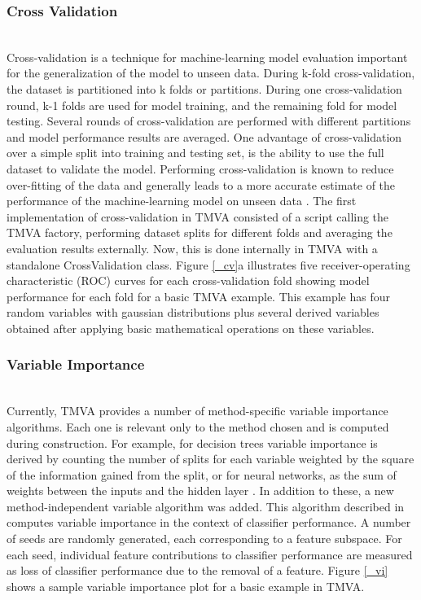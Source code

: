 \documentclass[a4paper]{jpconf}
\begin{document}
\subsubsection{Cross Validation}\hspace*{\fill} \\ 
Cross-validation is a technique for machine-learning model evaluation important for the generalization of the model to unseen data. During k-fold cross-validation, the dataset is partitioned into k folds or partitions. During one cross-validation round, k-1 folds are used for model training, and the remaining fold for model testing. Several rounds of cross-validation are performed with different partitions and model performance results are averaged. One advantage of cross-validation over a simple split into training and testing set, is the ability to use the full dataset to validate the model. Performing cross-validation is known to reduce over-fitting of the data and generally leads to a more accurate estimate of the performance of the machine-learning model on unseen data \cite{arlot2010survey}.\newline\newline 
The first implementation of cross-validation in TMVA consisted of a script calling the TMVA factory, performing dataset splits for different folds and averaging the evaluation results externally. Now, this is done internally in TMVA with a standalone CrossValidation class. Figure \ref{_cv}a illustrates five receiver-operating characteristic (ROC) curves for each cross-validation fold showing model performance for each fold for a basic TMVA example. This example has four random variables with gaussian distributions plus several derived variables obtained after applying basic mathematical operations on these variables.

\subsubsection{Variable Importance}\hspace*{\fill} \\
Currently, TMVA provides a number of method-specific variable importance algorithms. Each one is relevant only to the method chosen and is computed during construction. For example, for decision trees variable importance is derived by counting the number of splits for each variable weighted by the square of the information gained from the split,   or for neural networks, as the sum of weights between the inputs and the hidden layer \cite{Hocker:2007ht}.\newline\newline
In addition to these, a new method-independent variable algorithm was added. This algorithm described in\cite{gleyzer2008paradigm} computes variable importance in the context of classifier performance. A number of seeds are randomly generated, each corresponding to a feature subspace. For each seed, individual feature contributions to classifier performance are measured as loss of classifier performance due to the removal of a feature. Figure \ref{_vi} shows a sample variable importance plot for a basic example in TMVA.
\end{document}
